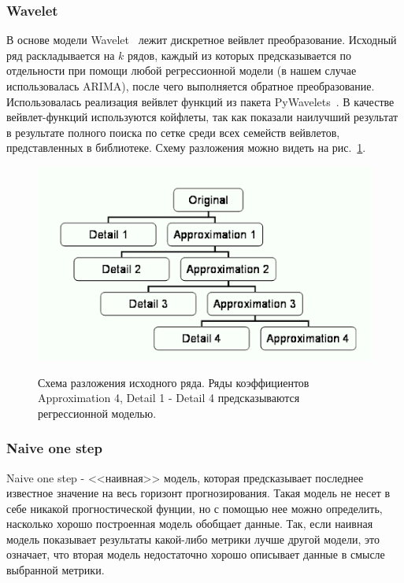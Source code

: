 \documentclass[a4paper,article,14pt]{extarticle}
\begin{document}
\subsubsection{Wavelet}
В основе модели Wavelet~\cite{wavelet} лежит дискретное вейвлет преобразование.
Исходный ряд раскладывается на $k$ рядов, каждый из которых предсказывается по отдельности при помощи любой регрессионной модели (в нашем случае использовалась ARIMA), после чего выполняется обратное преобразование.
Использовалась реализация вейвлет функций из пакета PyWavelets~\cite{pywt}.
В качестве вейвлет-функций используются койфлеты, так как показали наилучший результат в результате полного поиска по сетке среди всех семейств вейвлетов, представленных в библиотеке.
Схему разложения можно видеть на рис.~\ref{fig:wavelet}.

\begin{figure}
    \begin{center}
        \scalebox{0.6} {
            \includegraphics{images/wavelet}
        }
        \caption{
            Схема разложения исходного ряда. Ряды коэффициентов Approximation 4, Detail 1 - Detail 4 предсказываются регрессионной моделью.
            \label{fig:wavelet}
        }
    \end{center}
\end{figure}

\subsubsection{Naive one step}
Naive one step - <<наивная>> модель, которая предсказывает последнее известное значение на весь горизонт прогнозирования.
Такая модель не несет в себе никакой прогностической фунции, но с помощью нее можно определить, насколько хорошо построенная модель обобщает данные.
Так, если наивная модель показывает результаты какой-либо метрики лучше другой модели, это означает, что вторая модель недостаточно хорошо описывает данные в смысле выбранной метрики.
\end{document}
